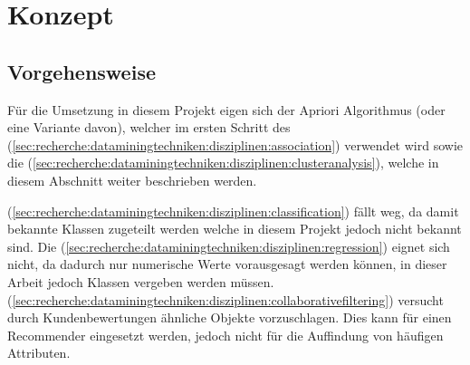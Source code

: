  
\chapter{Konzept}
\label{sec:konzept}

\section{Vorgehensweise}
\label{sec:konzept:vorgehensweise}
Für die Umsetzung in diesem Projekt eigen sich der Apriori Algorithmus (oder eine Variante davon), welcher im ersten Schritt des  (\cref{sec:recherche:dataminingtechniken:disziplinen:association}) verwendet wird sowie die  (\cref{sec:recherche:dataminingtechniken:disziplinen:clusteranalysis}), welche in diesem Abschnitt weiter beschrieben werden.

 (\cref{sec:recherche:dataminingtechniken:disziplinen:classification}) fällt weg, da damit bekannte Klassen zugeteilt werden welche in diesem Projekt jedoch nicht bekannt sind. Die  (\cref{sec:recherche:dataminingtechniken:disziplinen:regression}) eignet sich nicht, da dadurch nur numerische Werte vorausgesagt werden können, in dieser Arbeit jedoch Klassen vergeben werden müssen.  (\cref{sec:recherche:dataminingtechniken:disziplinen:collaborativefiltering}) versucht durch Kundenbewertungen ähnliche Objekte vorzuschlagen. Dies kann für einen Recommender eingesetzt werden, jedoch nicht für die Auffindung von häufigen Attributen.

